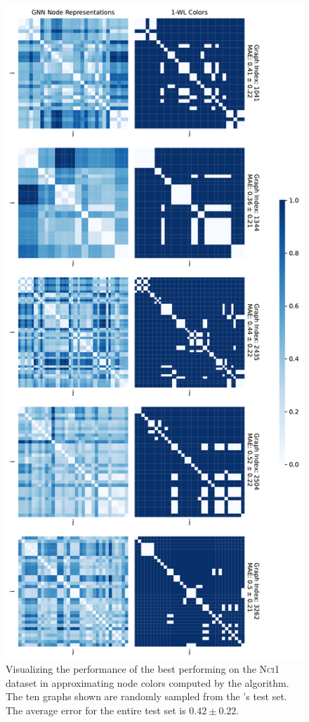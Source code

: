 \begin{figure}[H]
\begin{minipage}[b]{0.45992852703\textwidth}
    \end{minipage}
    \hfill
    \begin{minipage}[b]{0.53007147296\textwidth}
        \includegraphics[width=\textwidth, right]{Figures/heatmaps_NCI1_1_k_wl_1.pdf}
    \end{minipage}
    \hfill
    \caption{Visualizing the performance of the best performing \gnn on the \textsc{Nci1} dataset in approximating node colors computed by the \wl algorithm. The ten graphs shown are randomly sampled from the \gnn's test set. The average error for the entire test set is $0.42 \pm 0.22$.}
    \label{fig:gnn_approx_nci_1}
\end{figure}
\clearpage

